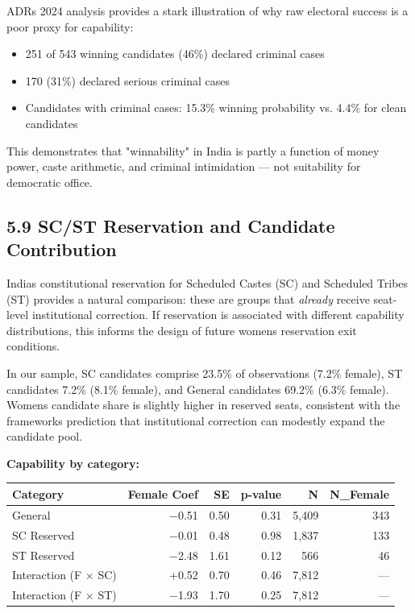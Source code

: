 \documentclass[
]{article}
\newcounter{none} %
\providecommand{\tightlist}{%
  \setlength{\itemsep}{0pt}\setlength{\parskip}{0pt}}
\begin{document}
ADR\textquotesingle s 2024 analysis provides a stark illustration of why raw electoral success is a poor proxy for capability:

\begin{itemize}
\tightlist
\item
  251 of 543 winning candidates (46\%) declared criminal cases
\item
  170 (31\%) declared serious criminal cases
\item
  Candidates with criminal cases: 15.3\% winning probability vs. 4.4\% for clean candidates
\end{itemize}

This demonstrates that "winnability" in India is partly a function of money power, caste arithmetic, and criminal intimidation --- not suitability for democratic office.

\subsection{5.9 SC/ST Reservation and Candidate Contribution}\label{59-scst-reservation-and-candidate-contribution}

India\textquotesingle s constitutional reservation for Scheduled Castes (SC) and Scheduled Tribes (ST) provides a natural comparison: these are groups that \emph{already} receive seat-level institutional correction. If reservation is associated with different capability distributions, this informs the design of future women\textquotesingle s reservation exit conditions.

In our sample, SC candidates comprise 23.5\% of observations (7.2\% female), ST candidates 7.2\% (8.1\% female), and General candidates 69.2\% (6.3\% female). Women\textquotesingle s candidate share is slightly higher in reserved seats, consistent with the framework\textquotesingle s prediction that institutional correction can modestly expand the candidate pool.

\textbf{Capability by category:}

{\def\LTcaptype{none} %
\begin{longtable}[]{@{}lrrrrr@{}}
\toprule\noalign{}
Category & Female Coef & SE & p-value & N & N\_Female \\
\midrule\noalign{}
\endhead
\bottomrule\noalign{}
\endlastfoot
General & $-$0.51 & 0.50 & 0.31 & 5,409 & 343 \\
SC Reserved & $-$0.01 & 0.48 & 0.98 & 1,837 & 133 \\
ST Reserved & $-$2.48 & 1.61 & 0.12 & 566 & 46 \\
Interaction (F $\times$ SC) & +0.52 & 0.70 & 0.46 & 7,812 & --- \\
Interaction (F $\times$ ST) & $-$1.93 & 1.70 & 0.25 & 7,812 & --- \\
\end{longtable}
}
\end{document}
